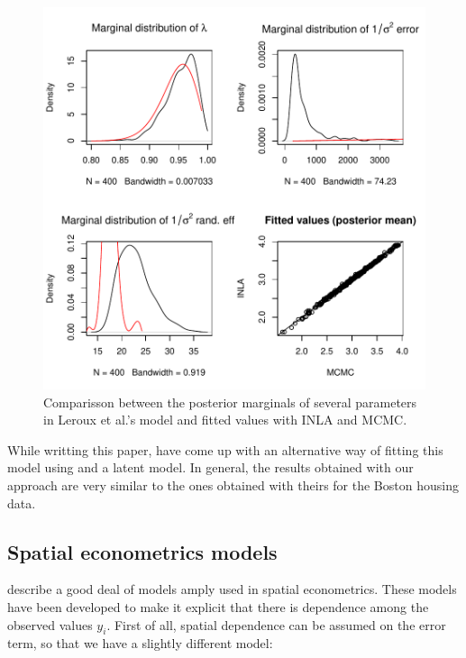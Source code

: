 \documentclass[article]{jss}
\begin{document}
\begin{figure}[h]
\begin{center}
\includegraphics{spatial_inla-027}
\end{center}
\caption{Comparisson between the posterior marginals of several parameters in 
Leroux et al.'s model and fitted values with INLA and MCMC.}
\label{fig:leroux}
\end{figure}

While writting this paper, \citet{LeeMitchell:2013} have come up with an
alternative way of fitting this model using  and a 
latent model. In general, the results obtained with our approach are very
similar to the ones obtained with theirs for the Boston housing data.








\subsection{Spatial econometrics models}

\citet{LeSagePace:2009} describe a good deal of models amply used in spatial
econometrics. These models have been developed to make it explicit that there
is dependence among the observed values $y_i$. First of all, spatial dependence
can be assumed on the error term, so that we have a slightly different model:
\end{document}
